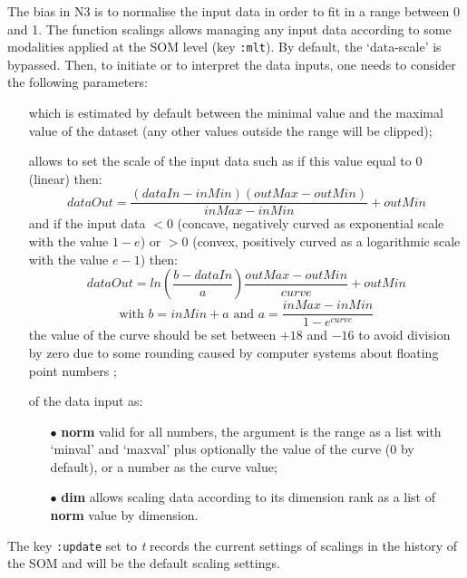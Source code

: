 \bigskip
\bigskip

\label{pt:as}

\bigskip

The bias in N3 is to normalise the input data in order to fit in a range between 0 and 1. The function \glspl{scaling} allows managing any input data according to some modalities applied at the SOM level (key \texttt{:mlt}). By default, the `data-scale' is bypassed. Then, to initiate or to interpret the data inputs, one needs to consider the following parameters:
\begin{itemize}
\item[]  which is estimated by default between the minimal value and the maximal value of the dataset (any other values outside the range will be clipped);
\newpage

\item[]  allows to set the scale of the input data such as if this value equal to 0 (linear) then: 
$$dataOut=\frac{(dataIn-inMin)(outMax-outMin)}{inMax-inMin}+outMin$$
and if the input data $< 0$ (concave, negatively curved as exponential scale with the value $1-e$) or $> 0$ (convex, positively curved as a logarithmic scale with the value $e-1$) then:
$$dataOut=ln\left(\dfrac{b-dataIn}{a}\right)\dfrac{outMax-outMin}{curve}+outMin$$
$$\text{with } b=inMin+a \text{ and }  a=\dfrac{inMax-inMin}{1-e^{curve}}$$ the value of the curve should be set between $+18$ and $-16$ to avoid division by zero due to some rounding caused by computer systems about floating point numbers \citep{re};
\item[]  of the data input as:
\begin{itemize}
\item[$\bullet$] \textbf{norm} valid for all numbers, the argument is the range as a list with `minval' and `maxval' plus optionally the value of the curve (0 by default), or a number as the curve value; %
\item[$\bullet$] \textbf{dim} allows scaling data according to its dimension rank as a list of \textbf{norm} value by dimension.
\end{itemize}
\end{itemize}
The key \texttt{:update} set to \textit{t} records the current settings of \glspl{scaling} in the history of the SOM and will be the default scaling settings. 

